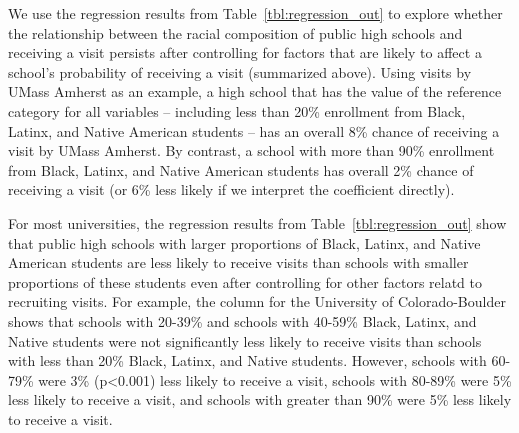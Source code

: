 \documentclass[twoside]{article}
\begin{document}
We use the regression results from Table~\ref{tbl:regression_out} to explore whether the relationship between the racial composition of public high schools and receiving a visit persists after controlling for factors that are likely to affect a school's probability of receiving a visit (summarized above). Using visits by UMass Amherst as an example, a high school that has the value of the reference category for all variables -- including less than 20\% enrollment from Black, Latinx, and Native American students -- has an overall 8\% chance of receiving a visit by UMass Amherst. By contrast, a school with more than 90\% enrollment from Black, Latinx, and Native American students has overall 2\% chance of receiving a visit (or 6\% less likely if we interpret the coefficient directly).

For most universities, the regression results from Table~\ref{tbl:regression_out} show that public high schools with larger proportions of Black, Latinx, and Native American students are less likely to receive visits than schools with smaller proportions of these students even after controlling for other factors relatd to recruiting visits. For example, the column for the University of Colorado-Boulder shows that schools with 20-39\% and schools with 40-59\% Black, Latinx, and Native students were not significantly less likely to receive visits than schools with less than 20\% Black, Latinx, and Native students.  However, schools with 60-79\% were 3\% (p<0.001) less likely to receive a visit, schools with 80-89\% were 5\% less likely to receive a visit, and schools with greater than 90\% were 5\% less likely to receive a visit.

\end{document}
